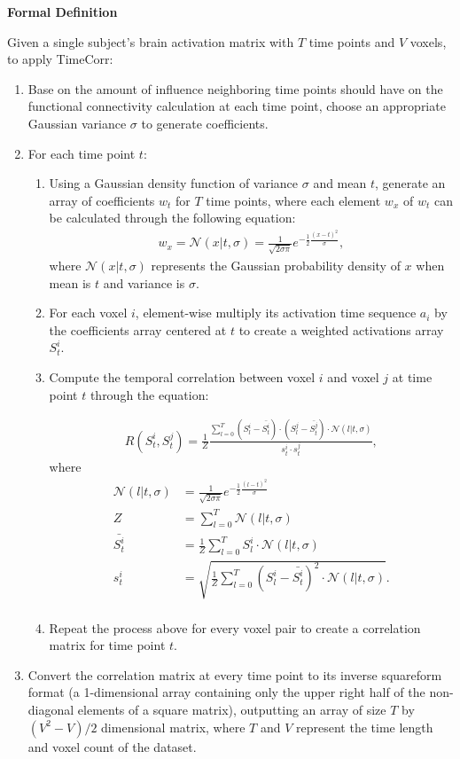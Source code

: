 \documentclass[11pt]{article}
\begin{document}
\large{\textbf{Formal Definition}}

\normalsize
Given a single subject's brain activation matrix with $T$ time points and $V$ voxels, to apply TimeCorr:

\begin{enumerate}
\item Base on the amount of influence neighboring time points should have on the functional connectivity calculation at each time point, choose an appropriate Gaussian variance $\sigma$ to generate coefficients.

\item For each time point $t$:
\begin{enumerate}
\item Using a Gaussian density function of variance $\sigma$ and mean $t$, generate an array of coefficients $w_t$ for $T$ time points, where each element $w_x$ of $w_t$ can be calculated through the following equation:
\begin{align*}
w_x = \mathcal{N}(x|t,\sigma) = \frac{1}{\sqrt{2\sigma\pi}}e^{-\frac12 \frac{(x-t)^2}{\sigma}},
\end{align*}
where $\mathcal{N}(x|t,\sigma)$ represents the Gaussian probability density of $x$ when mean is $t$ and variance is $\sigma$.

\item For each voxel $i$, element-wise multiply its activation time sequence $a_i$ by the coefficients array centered at $t$ to create a weighted activations array $S^i_t$.

\item Compute the temporal correlation between voxel $i$ and voxel $j$ at time point $t$ through the equation:

\begin{align*}
R(S^i_t,S^j_t) = \frac{1}{Z}\frac{\sum_{l=0}^T (S_l^i - \bar{S^i_t})\cdot(S^j_l - \bar{S^j_t})\cdot \mathcal{N}(l|t,\sigma)}{s_t^i \cdot s_t^j},
\end{align*}
where
\begin{align*}
\mathcal{N}(l|t,\sigma) &= \frac{1}{\sqrt{2\sigma\pi}}e^{-\frac12 \frac{(l-t)^2}{\sigma}}\\
Z &= \sum_{l=0}^T \mathcal{N}(l|t,\sigma)\\
\bar{S^i_t} &=\frac{1}{Z} \sum_{l=0}^T S^i_l \cdot \mathcal{N}(l|t,\sigma)\\
s_t^i &=\sqrt{ \frac{1}{Z}\sum_{l=0}^T (S_l^i-\bar{S_t^i})^2 \cdot \mathcal{N}(l|t,\sigma)}.\\
\end{align*}
\item Repeat the process above for every voxel pair to create a correlation matrix for time point $t$.
\end{enumerate}
\item Convert the correlation matrix at every time point to its inverse squareform format (a 1-dimensional array containing only the upper right half of the non-diagonal elements of a square matrix), outputting an array of size $T$ by $(V^2-V)/2$ dimensional matrix, where $T$ and $V$ represent the time length and voxel count of the dataset.
\end{enumerate}
\end{document}
